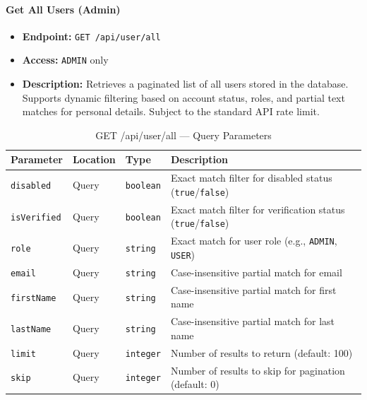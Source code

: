 \paragraph{Get All Users (Admin)}
\label{subsubsec:get-all-users}

\begin{itemize}
  \item \textbf{Endpoint:} \texttt{GET /api/user/all}
  \item \textbf{Access:} \texttt{ADMIN} only
  \item \textbf{Description:} Retrieves a paginated list of all users stored in the database. Supports dynamic filtering based on account status, roles, and partial text matches for personal details. Subject to the standard API rate limit.
\end{itemize}

\begin{table}[H]
\centering
\renewcommand{\arraystretch}{1.3}
\begin{tabularx}{\textwidth}{|l|l|l|X|}
\hline
\textbf{Parameter} & \textbf{Location} & \textbf{Type} & \textbf{Description} \\
\hline
\texttt{disabled}   & Query & \texttt{boolean} & Exact match filter for disabled status (\texttt{true}/\texttt{false}) \\
\hline
\texttt{isVerified} & Query & \texttt{boolean} & Exact match filter for verification status (\texttt{true}/\texttt{false}) \\
\hline
\texttt{role}       & Query & \texttt{string}  & Exact match for user role (e.g., \texttt{ADMIN}, \texttt{USER}) \\
\hline
\texttt{email}      & Query & \texttt{string}  & Case-insensitive partial match for email \\
\hline
\texttt{firstName}  & Query & \texttt{string}  & Case-insensitive partial match for first name \\
\hline
\texttt{lastName}   & Query & \texttt{string}  & Case-insensitive partial match for last name \\
\hline
\texttt{limit}      & Query & \texttt{integer} & Number of results to return (default: 100) \\
\hline
\texttt{skip}       & Query & \texttt{integer} & Number of results to skip for pagination (default: 0) \\
\hline
\end{tabularx}
\caption{GET /api/user/all — Query Parameters}
\label{tab:get-all-users-params}
\end{table}

